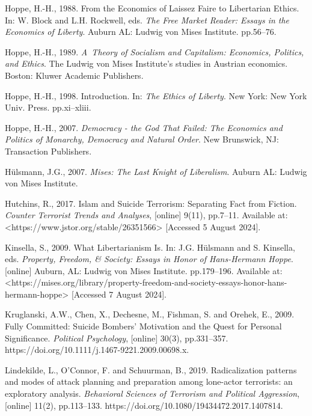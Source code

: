 Hoppe, H.-H., 1988. From the Economics of Laissez Faire to Libertarian Ethics. In: W. Block and L.H. Rockwell, eds. \textit{The Free Market Reader: Essays in the Economics of Liberty}. Auburn AL: Ludwig von Mises Institute. pp.56–76.



Hoppe, H.-H., 1989. \textit{A~Theory of Socialism and Capitalism: Economics, Politics, and Ethics}. The Ludwig von Mises Institute's studies in Austrian economics. Boston: Kluwer Academic Publishers.



Hoppe, H.-H., 1998. Introduction. In: \textit{The Ethics of Liberty}. New York: New York Univ. Press. pp.xi–xliii.



Hoppe, H.-H., 2007. \textit{Democracy - the God That Failed: The Economics and Politics of Monarchy, Democracy and Natural Order}. New Brunswick, NJ: Transaction Publishers.



Hülsmann, J.G., 2007. \textit{Mises: The Last Knight of Liberalism}. Auburn AL: Ludwig von Mises Institute.



Hutchins, R., 2017. Islam and Suicide Terrorism: Separating Fact from Fiction. \textit{Counter Terrorist Trends and Analyses}, [online] 9(11), pp.7–11. Available at: {\textless}https://www.jstor.org/stable/26351566{\textgreater} [Accessed 5 August 2024].



Kinsella, S., 2009. What Libertarianism Is. In: J.G. Hülsmann and S. Kinsella, eds. \textit{Property, Freedom, \& Society: Essays in Honor of Hans-Hermann Hoppe}. [online] Auburn, AL: Ludwig von Mises Institute. pp.179–196. Available at: {\textless}https://mises.org/library/property-freedom-and-society-essays-honor-hans-hermann-hoppe{\textgreater} [Accessed 7 August 2024].



Kruglanski, A.W., Chen, X., Dechesne, M., Fishman, S. and Orehek, E., 2009. Fully Committed: Suicide Bombers' Motivation and the Quest for Personal Significance. \textit{Political Psychology}, [online] 30(3), pp.331–357. https://doi.org/10.1111/j.1467-9221.2009.00698.x.



Lindekilde, L., O'Connor, F. and Schuurman, B., 2019. Radicalization patterns and modes of attack planning and preparation among lone-actor terrorists: an exploratory analysis. \textit{Behavioral Sciences of Terrorism and Political Aggression}, [online] 11(2), pp.113–133. https://doi.org/10.1080/19434472.2017.1407814.



